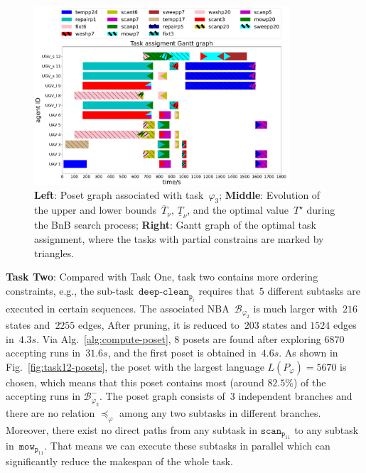 \begin{figure}[t!]
\begin{minipage}[t]{0.37\linewidth}
\end{minipage}%
  \begin{minipage}[t]{0.4\linewidth}
	\centering
	\includegraphics[width = 0.85\textwidth]{figures/simulation/task3/gantt_s0.pdf}

\end{minipage}%
  \caption{\textbf{Left}: Poset graph associated with task~$\varphi_3$;
    \textbf{Middle}: Evolution of the upper and lower
    bounds~$\overline{T}_\nu,\,\underline{T}_\nu$,
    and the optimal value~$T^\star$ during the BnB search process;
    \textbf{Right}: Gantt graph of the optimal task assignment,
    where the tasks with partial constrains are marked by triangles.}
  \label{fig:task3-results}
\end{figure}

\textbf{Task Two}:
Compared with Task One,
task two contains more ordering constraints, e.g.,
the sub-task~$\texttt{deep-clean}_{\texttt{p}_i}$ requires
that~$5$ different subtasks are executed in certain sequences.
The associated NBA~$\mathcal{B}_{\varphi_2}$ is much larger
with~$216$ states and~$2255$ edges,
After pruning, it is reduced to~$203$ states and $1524$ edges in~$4.3s$.
Via Alg.~\ref{alg:compute-poset},
$8$ posets are found after exploring $6870$ accepting runs in~$31.6s$,
and the first poset is obtained in~$4.6s$.
As shown in Fig.~\ref{fig:task12-posets},
the poset with the largest language $L(P_{\varphi})=5670$ is chosen,
which means that this poset contains most (around $82.5\%$)
of the accepting runs in $\mathcal{B}^-_{\varphi_2}$.
The poset graph consists of~$3$ independent branches and there are
no relation $\preceq_{\varphi}$ among any two subtasks in different branches.
Moreover, there exist no direct paths from any subtask in
$\texttt{scan}_{\texttt{p}_{11}}$ to any subtask in~$\texttt{mow}_{\texttt{p}_{11}}$.
That means we can execute these subtasks in parallel
which can significantly reduce the makespan of the whole task.

